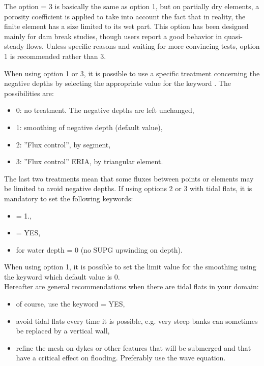 The option  = 3 is basically the same as
option 1, but on partially dry elements, a porosity coefficient is applied to
take into account the fact that in reality, the finite element has a size
limited to its wet part.
This option has been designed mainly for dam break studies, though users report
a good behavior in quasi-steady flows.
Unless specific reasons and waiting for more convincing tests, option 1 is
recommended rather than 3.

When using option 1 or 3, it is possible to use a specific treatment concerning
the negative depths by selecting the appropriate value for the keyword
.
The possibilities are:

\begin{itemize}
\item 0: no treatment. The negative depths are left unchanged,

\item 1: smoothing of negative depth (default value),

\item 2: ''Flux control'', by segment,

\item 3: ''Flux control'' ERIA, by triangular element.
\end{itemize}
The last two treatments mean that some fluxes between points or elements
may be limited to avoid negative depths.
If using options 2 or 3 with tidal flats, it is mandatory to set the following
keywords:
\begin{itemize}
\item {} = 1.,
\item {} = YES,
\item {} for water depth = 0 (no SUPG upwinding on depth).
\end{itemize}

When using option 1, it is possible to set the limit value for the smoothing
using the keyword 
which default value is 0.\\

Hereafter are general recommendations when there are tidal flats in your domain:

\begin{itemize}
\item of course, use the keyword  = YES,

\item avoid tidal flats every time it is possible,
e.g. very steep banks can sometimes be replaced by a vertical wall,

\item refine the mesh on dykes or other features that will be submerged
and that have a critical effect on flooding. Preferably use the wave equation.
\end{itemize}

